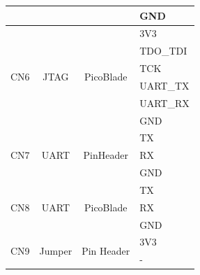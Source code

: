 \begin{table}[!htb]
\begin{tabular}{lccl}
                             &                       &                            & GND \\
        \midrule
        \multirow{6}{*}{CN6} & \multirow{6}{*}{JTAG} & \multirow{6}{*}{PicoBlade} & 3V3 \\
                             &                       &                            & TDO\_TDI \\
                             &                       &                            & TCK \\
                             &                       &                            & UART\_TX \\
                             &                       &                            & UART\_RX \\
                             &                       &                            & GND \\
        \midrule
        \multirow{3}{*}{CN7} & \multirow{3}{*}{UART} & \multirow{3}{*}{PinHeader} & TX \\
                             &                       &                            & RX \\
                             &                       &                            & GND \\
        \midrule
        \multirow{3}{*}{CN8} & \multirow{3}{*}{UART} & \multirow{3}{*}{PicoBlade} & TX \\
                             &                       &                            & RX \\
                             &                       &                            & GND \\
        \midrule
        \multirow{2}{*}{CN9} & \multirow{2}{*}{Jumper} & \multirow{2}{*}{Pin Header} & 3V3 \\
                             &                         &                      & - \\
        \bottomrule[1.5pt]
    \end{tabular}
    \label{tab:other-elect_interf}
\end{table}

